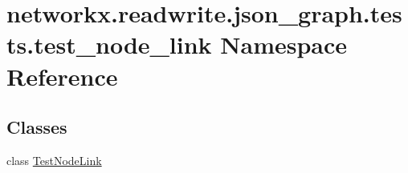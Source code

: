 \hypertarget{namespacenetworkx_1_1readwrite_1_1json__graph_1_1tests_1_1test__node__link}{}\section{networkx.\+readwrite.\+json\+\_\+graph.\+tests.\+test\+\_\+node\+\_\+link Namespace Reference}
\label{namespacenetworkx_1_1readwrite_1_1json__graph_1_1tests_1_1test__node__link}
\subsection*{Classes}
\begin{DoxyCompactItemize}
\item 
class \hyperlink{classnetworkx_1_1readwrite_1_1json__graph_1_1tests_1_1test__node__link_1_1TestNodeLink}{Test\+Node\+Link}
\end{DoxyCompactItemize}
